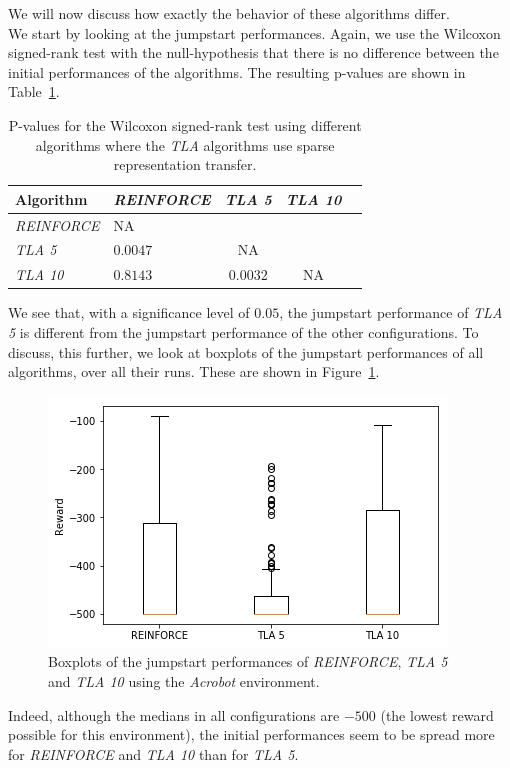We will now discuss how exactly the behavior of these algorithms differ.\\
We start by looking at the jumpstart performances. Again, we use the Wilcoxon signed-rank test with the null-hypothesis that there is no difference between the initial performances of the algorithms. The resulting p-values are shown in Table~\ref{tab:sparse:pvalues}.
\begin{table}[htb]
    \centering
    \begin{tabular}{llccc}
    \hline
    Algorithm & \textit{REINFORCE} & \textit{TLA 5} & \textit{TLA 10} \\
    \hline
       \textit{REINFORCE}  & NA & & \\
       \textit{TLA 5} & $0.0047$ & NA & \\
       \textit{TLA 10} & $0.8143$ & $0.0032$ & NA \\
    \hline
    \end{tabular}
    \caption{P-values for the Wilcoxon signed-rank test using different algorithms where the \textit{TLA} algorithms use sparse representation transfer.}
    \label{tab:sparse:pvalues}
\end{table}
We see that, with a significance level of $0.05$, the jumpstart performance of \textit{TLA 5} is different from the jumpstart performance of the other configurations. To discuss, this further, we look at boxplots of the jumpstart performances of all algorithms, over all their runs. These are shown in Figure~\ref{fig:Acrobot:jumpstart_target_re-akt5-akt10}.
\begin{figure}[htb]
    \centering
    \includegraphics[width=\linewidth]{images/results/Acrobot/no_sparse_transfer/jumpstart_target_re-akt5-akt10.png}
    \caption{Boxplots of the jumpstart performances of \textit{REINFORCE}, \textit{TLA 5} and \textit{TLA 10} using the \textit{Acrobot} environment.}
    \label{fig:Acrobot:jumpstart_target_re-akt5-akt10}
\end{figure}
Indeed, although the medians in all configurations are $-500$ (the lowest reward possible for this environment), the initial performances seem to be spread more for \textit{REINFORCE} and \textit{TLA 10} than for \textit{TLA 5}.\\

